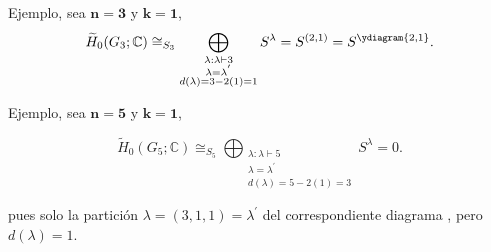 \documentclass[final,xcolor=svgnames]{beamer}
\begin{document}
\begin{frame}{}
\begin{columns}
\begin{column}{0.5\textwidth}
        \begin{block}{Ejemplo, sea $\boldsymbol{n=3}$ y $\boldsymbol{k=1}$,}
          \begin{equation*}
            \widetilde H_{0}(G_{3};\mathbb{C})\cong_{S_{3}}\bigoplus_{\substack{\lambda:\lambda\vdash 3\\
              \lambda=\lambda^{'}\\d(\lambda)=3-2(1)=1}} S^{\lambda}=S^{(2,1)}=S^{\ydiagram{2,1}}.
          \end{equation*}
       \end{block}

       \begin{block}{Ejemplo, sea $\boldsymbol{n=5}$ y $\boldsymbol{k=1}$,}
          \begin{minipage}{0.48\linewidth}    
            \centering
           \begin{equation*}
             \widetilde H_{0}(G_{5};\mathbb{C})\cong_{S_{5}}\bigoplus_{\substack{\lambda:\lambda\vdash 5\\
                 \lambda=\lambda^{'}\\d(\lambda)=5-2(1)=3}} S^{\lambda}=0.
           \end{equation*}
          \end{minipage}
          \begin{minipage}{0.5\linewidth}    
           pues solo la partición $\lambda=(3,1,1)=\lambda^{'}$ del
           correspondiente diagrama , pero
           $d(\lambda)=1$.
         \end{minipage}
       \end{block}
      

\end{column}
\end{columns}
\end{frame}
\end{document}
